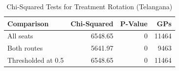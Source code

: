 \begin{table}[!h]
\centering
\caption{\label{tab:chi_sq_tg}Chi-Squared Tests for Treatment Rotation (Telangana)}
\centering
\fontsize{8}{10}\selectfont
\begin{tabular}[t]{lrrr}
\toprule
Comparison & Chi-Squared & P-Value & GPs\\
\midrule
All seats & 6548.65 & 0 & 11464\\
Both routes & 5641.97 & 0 & 9463\\
Thresholded at 0.5 & 6548.65 & 0 & 11464\\
\bottomrule
\end{tabular}
\end{table}
